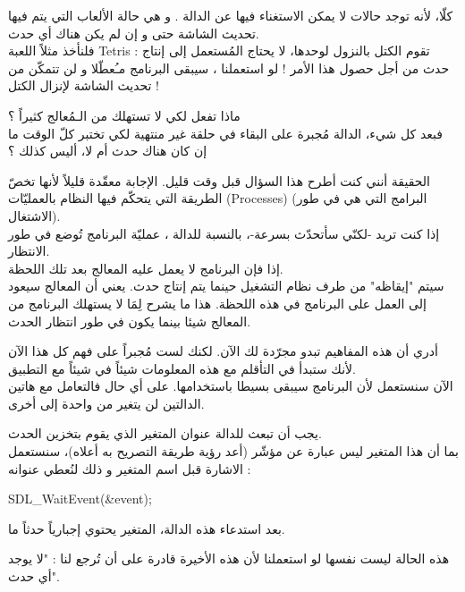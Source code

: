 كلّا، لأنه توجد حالات لا يمكن الاستغناء فيها عن الدالة 
.
و هي حالة الألعاب التي يتم فيها تحديث الشاشة حتى و إن لم يكن هناك أي حدث.\\
فلنأخذ مثلاً اللعبة 
\textenglish{Tetris} :
تقوم الكتل بالنزول لوحدها، لا يحتاج المُستعمل إلى إنتاج حدث من أجل حصول هذا الأمر ! لو استعملنا
،
سيبقى البرنامج مـُعطّلا و لن تتمكّن من تحديث الشاشة لإنزال الكتل !

\begin{question}
ماذا تفعل
لكي لا تستهلك من الـمُعالج كثيراً ؟\\
فبعد كل شيء، الدالة مُجبرة على البقاء في حلقة غير منتهية لكي تختبر كلّ الوقت ما إن كان هناك حدث أم لا، أليس كذلك ؟
\end{question}

الحقيقة أنني كنت أطرح هذا السؤال قبل وقت قليل. الإجابة معقّدة قليلاً لأنها تخصّ الطريقة التي يتحكّم فيها النظام بالعمليّات 
(\textenglish{Processes})
(البرامج التي هي في طور الاشتغال).\\
إذا كنت تريد -لكنّي سأتحدّث بسرعة-، بالنسبة للدالة 
،
عمليّة البرنامج تُوضع في طور الانتظار.\\
إذا فإن البرنامج لا يعمل عليه المعالج بعد تلك اللحظة.\\
سيتم "إيقاظه" من طرف نظام التشغيل حينما يتم إنتاج حدث. يعني أن المعالج سيعود إلى العمل على البرنامج في هذه اللحظة. هذا ما يشرح لِمَا لا يستهلك البرنامج من المعالج شيئا بينما يكون في طور انتظار الحدث.

أدري أن هذه المفاهيم تبدو مجرّدة لك الآن. لكنك لست مُجبراً على فهم كل هذا الآن لأنك ستبدأ في التأقلم مع هذه المعلومات شيئاً في شيئاً مع التطبيق.\\
الآن سنستعمل 
لأن البرنامج سيبقى بسيطا باستخدامها. على أي حال فالتعامل مع هاتين الدالتين لن يتغير من واحدة إلى أخرى.

يجب أن تبعث للدالة عنوان المتغير 
الذي يقوم بتخزين الحدث.\\
بما أن هذا المتغير ليس عبارة عن مؤشّر (أعد رؤية طريقة التصريح به أعلاه)، سنستعمل الاشارة
\InlineCode{\&}
قبل اسم المتغير و ذلك لنُعطي عنوانه :

\begin{Csource}
SDL_WaitEvent(&event);
\end{Csource}

بعد استدعاء هذه الدالة، المتغير
يحتوي إجبارياً حدثاً ما.

\begin{information}
هذه الحالة ليست نفسها لو استعملنا
لأن هذه الأخيرة قادرة على أن تُرجع لنا : "لا يوجد أي حدث".
\end{information}

